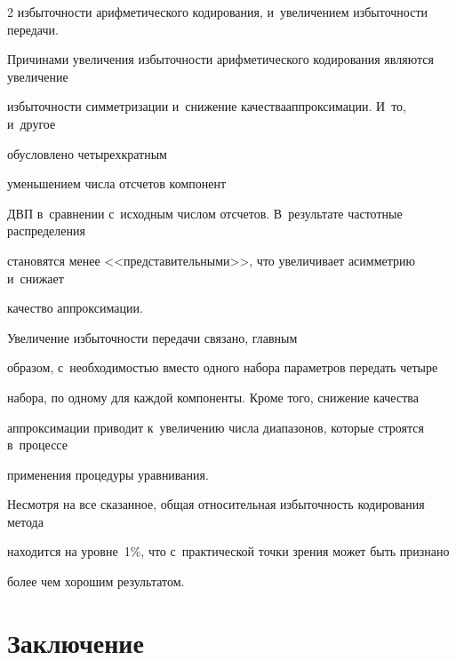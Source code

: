 \begin{multicols}{2}
избыточности арифметического кодирования, и~увеличением избыточности передачи. 



Причинами увеличения избыточности арифметического кодирования являются увеличение 

избыточности симметризации и~снижение качества\linebreak аппроксимации. И~то, и~другое 

обусловлено четырехкратным %

уменьшением числа отсчетов компонент 

ДВП в~сравнении с~исходным числом отсчетов. В~ре\-зуль\-та\-те частотные распределения\linebreak 

стано\-вят\-ся менее <<представительными>>, что увеличивает асим\-мет\-рию и~снижает 

качество аппрокси\-мации. 

{ %



}



Увеличение избыточности передачи связано, главным 

образом, с~необходимостью вместо одного набора параметров передать четыре 

набора, по одному для каждой компоненты. Кроме того, снижение качества 

аппроксимации приводит к~увеличению числа диапазонов, которые строятся в~процессе 

применения процедуры уравни\-вания.

{



}



Несмотря на все сказанное, общая относительная избыточность кодирования метода 

находится на уровне~1\%, что с~практической точки зрения может быть признано 

более чем хорошим результатом.



\vspace*{-6pt}



\section{Заключение}




\end{multicols}
